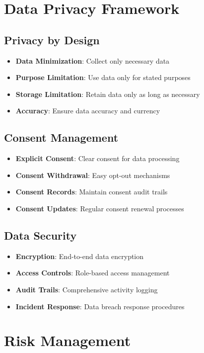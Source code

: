 \documentclass[business]{../templates/infraradar-main}
\begin{document}
\section{Data Privacy Framework}

\subsection{Privacy by Design}
\begin{itemize}
    \item \textbf{Data Minimization}: Collect only necessary data
    \item \textbf{Purpose Limitation}: Use data only for stated purposes
    \item \textbf{Storage Limitation}: Retain data only as long as necessary
    \item \textbf{Accuracy}: Ensure data accuracy and currency
\end{itemize}

\subsection{Consent Management}
\begin{itemize}
    \item \textbf{Explicit Consent}: Clear consent for data processing
    \item \textbf{Consent Withdrawal}: Easy opt-out mechanisms
    \item \textbf{Consent Records}: Maintain consent audit trails
    \item \textbf{Consent Updates}: Regular consent renewal processes
\end{itemize}

\subsection{Data Security}
\begin{itemize}
    \item \textbf{Encryption}: End-to-end data encryption
    \item \textbf{Access Controls}: Role-based access management
    \item \textbf{Audit Trails}: Comprehensive activity logging
    \item \textbf{Incident Response}: Data breach response procedures
\end{itemize}

\section{Risk Management}
\end{document}
